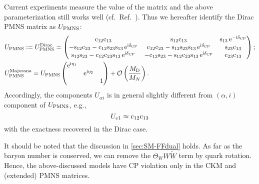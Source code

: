 \documentclass[CheatSheet]{subfiles}
\newcommand\MD[1][]{M_{\mathrm{D}#1}}
\newcommand\MN[1][]{M_{N#1}}
\begin{document}
Current experiments measure the value of the matrix and the above parameterization still works well (cf.~Ref.~\cite{NUFIT}).
Thus we hereafter identify the Dirac PMNS matrix as $U_{\mathrm{PMNS}}$:
\begin{align}
 &U\w{PMNS}:=U\w{PMNS}^{\text{Dirac}}=
 \pmat{
 \co{12} \co{13} & \si{12} \co{13} & \si{13} \ee^{-\ii\delta\w{CP}}\\
 -\si{12} \co{23} - \co{12} \si{23} \si{13} \ee^{\ii\delta\w{CP}}& \co{12} \co{23} - \si{12}\si{23}\si{13} \ee^{\ii\delta\w{CP}}& \si{23}\co{13}\\
  \si{12}\si{23} - \co{12} \co{23} \si{13}\ee^{\ii\delta\w{CP}} & -\co{12}\si{23}-\si{12}\co{23}\si{13}\ee^{\ii\delta\w{CP}} & \co{23} \co{13}
};\\
 &U\w{PMNS}^{\text{Majorana}} = U\w{PMNS}\pmat{\ee^{\ii\eta_1} \\ & \ee^{\ii\eta_2}\\&&1}
+\Order\left(\frac{\MD}{\MN}\right).
\end{align}
Accordingly, the components $U_{\alpha i}$ is in general slightly different from $(\alpha,i)$ component of $U_{\mathrm{PMNS}}$, e.g.,
\begin{equation*}
 U_{e1}\approx \mathrm{c}_{12}\mathrm{c}_{13}
\end{equation*}
with the exactness recovered in the Dirac case.

It should be noted that the discussion in \cref{sec:SM-FFdual} holds.
As far as the baryon number is conserved, we can remove the $\Theta_W W\tilde W$ term by quark rotation.
Hence, the above-discussed models have CP violation only in the CKM and (extended) PMNS matrices.
\end{document}
